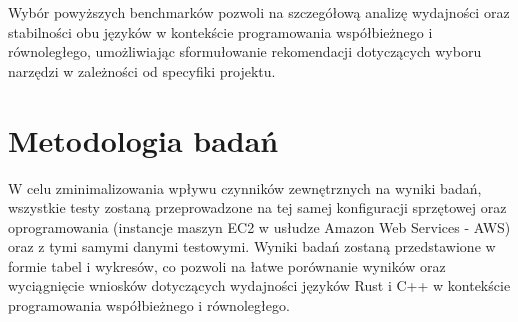 Wybór powyższych benchmarków pozwoli na szczegółową analizę wydajności oraz stabilności obu języków w kontekście programowania współbieżnego i równoległego, umożliwiając sformułowanie rekomendacji dotyczących wyboru narzędzi w zależności od specyfiki projektu.

\section{Metodologia badań}
W celu zminimalizowania wpływu czynników zewnętrznych na wyniki badań, wszystkie testy zostaną przeprowadzone na tej samej konfiguracji sprzętowej oraz oprogramowania (instancje maszyn EC2 w usłudze Amazon Web Services - AWS) oraz z tymi samymi danymi testowymi. Wyniki badań zostaną przedstawione w formie tabel i wykresów, co pozwoli na łatwe porównanie wyników oraz wyciągnięcie wniosków dotyczących wydajności języków Rust i C++ w kontekście programowania współbieżnego i równoległego.

